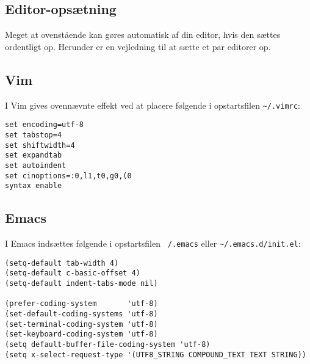 \documentclass[article, 10pt]{memoir}
\begin{document}
\begin{multicols}{2}
    \section{Editor-opsætning}
    Meget at ovenstående kan gøres automatisk af din editor, hvis den sættes ordentligt op. Herunder er en vejledning til at sætte et par editorer op.

    \subsection{Vim}
    I Vim gives ovennævnte effekt ved at placere følgende i opstartsfilen \verb|~/.vimrc|:
    \begin{lstlisting}
set encoding=utf-8
set tabstop=4
set shiftwidth=4
set expandtab
set autoindent
set cinoptions=:0,l1,t0,g0,(0
syntax enable
    \end{lstlisting}

    \subsection{Emacs}
    I Emacs indsættes følgende i opstartsfilen \texttt{~/.emacs} eller \verb|~/.emacs.d/init.el|:
    \begin{lstlisting}
(setq-default tab-width 4)
(setq-default c-basic-offset 4)
(setq-default indent-tabs-mode nil)

(prefer-coding-system       'utf-8)
(set-default-coding-systems 'utf-8)
(set-terminal-coding-system 'utf-8)
(set-keyboard-coding-system 'utf-8)
(setq default-buffer-file-coding-system 'utf-8)
(setq x-select-request-type '(UTF8_STRING COMPOUND_TEXT TEXT STRING))
    \end{lstlisting}


\end{multicols}
\end{document}
